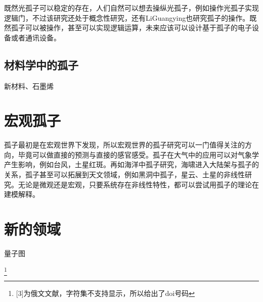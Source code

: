 \documentclass{article}
\begin{document}
\begin{multicols}{2}
既然光孤子可以稳定的存在，人们自然可以想去操纵光孤子，例如操作光孤子实现逻辑门\cite{jandieri2020functional}，不过该研究还处于概念性研究，还有LiGuangying也研究孤子的操作\cite{li2020dissipative}。既然孤子可以被操作，甚至可以实现逻辑运算，未来应该可以设计基于孤子的电子设备或者通讯设备。
\subsection{材料学中的孤子}
新材料、石墨烯
\section{宏观孤子}
孤子最初是在宏观世界下发现，所以宏观世界的孤子研究可以一门值得关注的方向，毕竟可以做直接的预测与直接的感官感受。孤子在大气中的应用可以对气象学产生影响，例如台风，土星红斑。再如海洋中孤子研究\cite{stepanyants2020nonlinear}，海啸进入大陆架与孤子的关系\cite{zhao2019the}，孤子甚至可以拓展到天文领域，例如黑洞中孤子\cite{dymnikova2020regular}，星云、土星的非线性研究\cite{ludu2019rotating}。无论是微观还是宏观，只要系统存在非线性特性，都可以尝试用孤子的理论在建模解释。

\section{新的领域}
量子图
\end{multicols}

%


\footnote{[3]为俄文文献，字符集不支持显示，所以给出了doi号码} 
\end{document}
